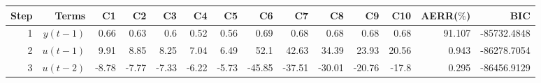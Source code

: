 \begin{tabular}{rrrrrrrrrrrrrr}
Step & Terms & C1 & C2 & C3 & C4 & C5 & C6 & C7 & C8 & C9 & C10 & AERR($\%$) & BIC \\ 
\hline 
1 & $y(t-1)$ & 0.66 & 0.63 & 0.6 & 0.52 & 0.56 & 0.69 & 0.68 & 0.68 & 0.68 & 0.68 & 91.107 & -85732.4848 \\ 
2 & $u(t-1)$ & 9.91 & 8.85 & 8.25 & 7.04 & 6.49 & 52.1 & 42.63 & 34.39 & 23.93 & 20.56 & 0.943 & -86278.7054 \\ 
3 & $u(t-2)$ & -8.78 & -7.77 & -7.33 & -6.22 & -5.73 & -45.85 & -37.51 & -30.01 & -20.76 & -17.8 & 0.295 & -86456.9129 \\ 
\hline 
\end{tabular}